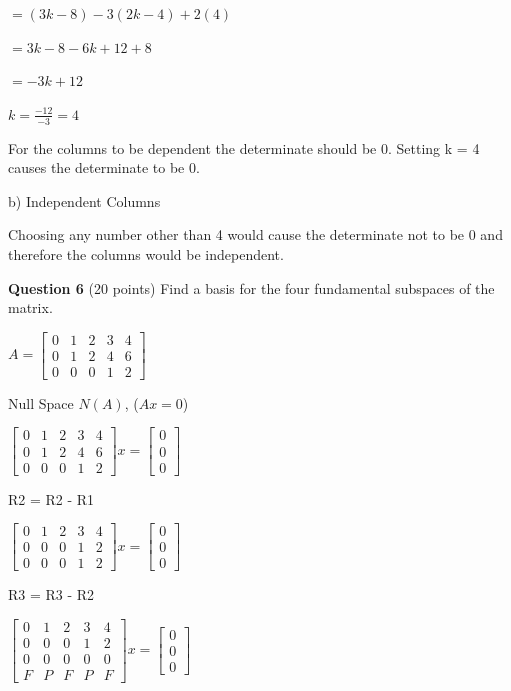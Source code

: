 \documentclass{article}
\begin{document}
            $= (3k - 8) - 3(2k - 4) + 2(4)$
            
            $ = 3k - 8 -6k + 12 + 8$
            
            $= -3k + 12$
            
            $k = \frac{-12}{-3} = 4$

For the columns to be dependent the determinate should be 0.  Setting k = 4 causes the determinate to be 0.

b) Independent Columns

Choosing any number other than 4 would cause the determinate not to be 0 and therefore the columns would be independent.

\vspace{2em}
\noindent
\textbf{Question 6} (20 points) Find a basis for the four fundamental subspaces of the matrix.

$A = \begin{bmatrix}
    0 & 1 & 2 & 3 & 4 \\
    0 & 1 & 2 & 4 & 6 \\
    0 & 0 & 0 & 1 & 2
\end{bmatrix}$

Null Space $N(A)$, ($Ax=0$)

$\begin{bmatrix}
    0 & 1 & 2 & 3 & 4 \\
    0 & 1 & 2 & 4 & 6 \\
    0 & 0 & 0 & 1 & 2
\end{bmatrix}x = \begin{bmatrix}
    0 \\ 0 \\ 0
\end{bmatrix}$

R2 = R2 - R1

$\begin{bmatrix}
    0 & 1 & 2 & 3 & 4 \\
    0 & 0 & 0 & 1 & 2 \\
    0 & 0 & 0 & 1 & 2
\end{bmatrix}x = \begin{bmatrix}
    0 \\ 0 \\ 0
\end{bmatrix}$

R3 = R3 - R2

$\begin{bmatrix}
    0 & 1 & 2 & 3 & 4 \\
    0 & 0 & 0 & 1 & 2 \\
    0 & 0 & 0 & 0 & 0 \\
    F & P & F & P & F
\end{bmatrix}x = \begin{bmatrix}
    0 \\ 0 \\ 0
\end{bmatrix}$ 
\end{document}
